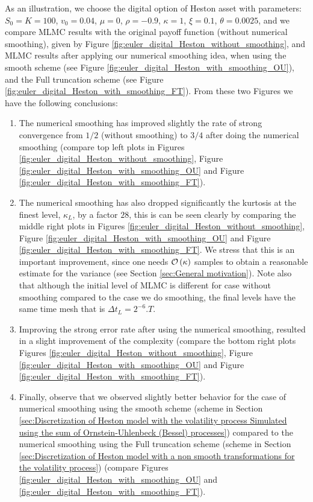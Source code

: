 As an illustration, we choose the digital option of Heston asset with parameters: $S_0=K=100$, $v_0=0.04$, $\mu=0$,  $\rho=-0.9$, $\kappa=1$, $\xi=0.1$, $\theta=0.0025$, and we compare MLMC results with the original payoff function (without numerical smoothing), given by Figure \ref{fig:euler_digital_Heston_without_smoothing},  and MLMC results after applying our numerical smoothing idea, when using the smooth scheme (see Figure \ref{fig:euler_digital_Heston_with_smoothing_OU}), and the Full truncation scheme (see Figure \ref{fig:euler_digital_Heston_with_smoothing_FT}). From these two Figures we have the following conclusions:
\begin{enumerate}
\item The numerical smoothing has improved slightly the rate of strong convergence from $1/2$ (without smoothing) to $3/4$ after doing the numerical smoothing (compare  top left plots in Figures \ref{fig:euler_digital_Heston_without_smoothing}, Figure \ref{fig:euler_digital_Heston_with_smoothing_OU} and Figure \ref{fig:euler_digital_Heston_with_smoothing_FT}).
\item The numerical smoothing has also dropped significantly the kurtosis at the finest level, $\kappa_L$,  by a factor $28$, this is can be seen clearly by comparing the middle right plots in Figures \ref{fig:euler_digital_Heston_without_smoothing}, Figure \ref{fig:euler_digital_Heston_with_smoothing_OU} and Figure \ref{fig:euler_digital_Heston_with_smoothing_FT}. We stress that this is an important improvement, since one needs ${\mathcal{O}}\left(\kappa\right)$ samples  to obtain a reasonable estimate for the variance (see Section \ref{sec:General motivation}).   Note also that although the initial level of MLMC is different for case without smoothing compared to the case we do smoothing, the final levels have the same time mesh that is $\Delta t_{L}=2^{-6}.T$.
\item Improving the strong error rate after using the numerical smoothing, resulted in a slight improvement of the complexity (compare the bottom right plots Figures \ref{fig:euler_digital_Heston_without_smoothing}, Figure \ref{fig:euler_digital_Heston_with_smoothing_OU} and Figure \ref{fig:euler_digital_Heston_with_smoothing_FT}).
\item Finally, observe that we observed slightly better behavior for the case of numerical smoothing using the smooth scheme (scheme in Section \ref{sec:Discretization of Heston model with the volatility process Simulated using the sum of  Ornstein-Uhlenbeck (Bessel) processes}) compared to the numerical smoothing using the Full truncation scheme (scheme in Section \ref{sec:Discretization of Heston model with a non smooth transformations for the volatility process}) (compare Figures \ref{fig:euler_digital_Heston_with_smoothing_OU} and  \ref{fig:euler_digital_Heston_with_smoothing_FT}).
\end{enumerate}

